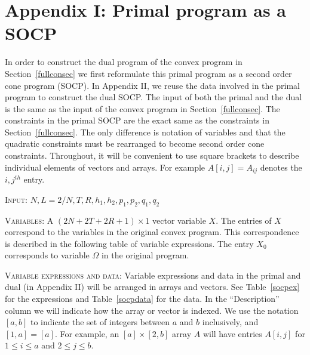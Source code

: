 \documentclass[12pt]{article}
\numberwithin{equation}{section}
\begin{document}
\clearpage



\section{Appendix I: Primal program as a SOCP}

In order to construct the dual program of the convex program in Section~\ref{fullconsec} we first reformulate this primal program as a second order cone program (SOCP). In Appendix II, we reuse the data involved in the primal program to construct the dual SOCP. The input of both the primal and the dual is the same as the input of the convex program in Section~\ref{fullconsec}. The constraints in the primal SOCP are the exact same as the constraints in Section~\ref{fullconsec}. The only difference is notation of variables and that the quadratic constraints must be rearranged to become second order cone constraints. Throughout, it will be convenient to use square brackets to describe individual elements of vectors and arrays. For example $A[i,j] = A_{ij}$ denotes the $i,j^{th}$ entry. 
\vspace{0.15cm}





\noindent\textsc{Input: }  $N,L=2/N,T,R, h_1,h_2,p_1,p_2,q_1,q_2$ 
\vspace{0.15cm}

\noindent\textsc{Variables: } A $(2N+2T+2R+1) \times 1$ vector variable $X$. The entries of $X$ correspond to the variables in the original convex program. This correspondence is described in the following table of variable expressions. The entry $X_0$ corresponds to variable $\Omega$ in the original program. 

\vspace{0.05cm} 

\noindent\textsc{Variable expressions and data: } Variable expressions and data in the primal and dual (in Appendix II) will be arranged in arrays and vectors. See Table~\ref{socpex} for the expressions and Table~\ref{socpdata} for the data.  In the ``Description'' column we will indicate how the array or vector is indexed. We use the notation $[a,b]$ to indicate the set of integers between $a$ and $b$ inclusively, and $[1,a] = [a]$. For example, an $[a] \times [2,b]$ array $A$ will have entries $A[i,j]$ for $1 \leq i \leq a$ and $2 \leq j \leq b$. 

\vspace{0.15cm} 
\end{document}
